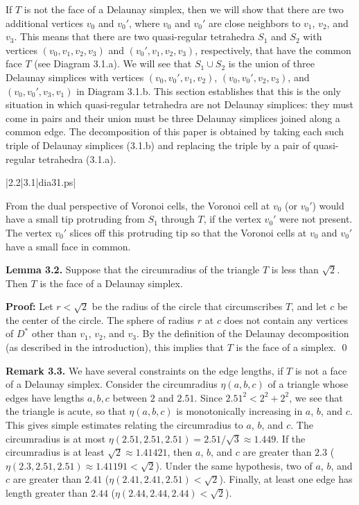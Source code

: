 If $T$ is not the face of a Delaunay simplex, then
we will show that there are two additional vertices
$v_0$ and $v_0'$, where $v_0$ and $v_0'$ are close neighbors
to $v_1$, $v_2$, and $v_3$.  This means that there
are two quasi-regular tetrahedra $S_1$ and $S_2$ with
vertices $(v_0,v_1,v_2,v_3)$ and $(v_0',v_1,v_2,v_3)$, 
respectively,
that have the common face $T$ (see Diagram 3.1.a).
We will see that $S_1\cup S_2$ is the union of three
Delaunay simplices with vertices $(v_0,v_0',v_1,v_2)$, 
$(v_0,v_0',v_2,v_3)$,
and $(v_0,v_0',v_3,v_1)$ 
in Diagram 3.1.b.  This section establishes
that this is the only situation in which quasi-regular
tetrahedra are not Delaunay simplices:  they must come
in pairs and their union must be three Delaunay simplices
joined along a common edge.
The decomposition of this paper is obtained by
taking each such triple of Delaunay simplices (3.1.b)
and replacing the triple by a pair of quasi-regular
tetrahedra (3.1.a).

\gram|2.2|3.1|dia31.ps|  %

From the dual perspective of Voronoi cells, the Voronoi
cell at $v_0$ (or $v_0'$)  would have a small tip protruding from $S_1$
through $T$, if the vertex $v_0'$ were not present.
The vertex $v_0'$ slices off this protruding tip so that
the Voronoi cells at $v_0$ and $v_0'$ have a small face in common.

\bigskip 
{\bf Lemma 3.2.}  Suppose that the circumradius of the triangle $T$
is less than $\sqrt{2}$.  Then $T$ is the face of a Delaunay simplex.

\bigskip
{\bf Proof:}  Let $r<\sqrt{2}$ be the radius of the circle that
circumscribes $T$, and let $c$ be the center of the circle.
The sphere of radius $r$ at $c$ does not contain any vertices of $D^*$
other than $v_1$, $v_2$, and $v_3$.  By the definition of the
Delaunay decomposition (as described in
the introduction), this implies that $T$
is the face of a simplex. \qed

\bigskip
{\bf Remark 3.3.} We have several constraints on the edge lengths, if
$T$ is not a face of a Delaunay simplex.
Consider the circumradius $\eta(a,b,c)$ of 
a triangle whose edges have lengths $a,b,c$
between $2$ and $2.51$.
Since $2.51^2 < 2^2 + 2^2$, we see that the
triangle is acute, so that $\eta(a,b,c)$ 
is monotonically increasing in $a$, $b$, and $c$.
This
gives simple estimates relating the circumradius to $a$, $b$, and $c$.
The circumradius is at most 
$\eta(2.51,2.51,2.51)=2.51/\sqrt{3}\approx 1.449$.
If the circumradius is at least $\sqrt{2}\approx 1.41421$, then
$a$, $b$, and $c$ are greater than $2.3$  
($\eta(2.3,2.51,2.51)\approx 1.41191<\sqrt{2}$).
Under the same hypothesis, two of $a$, $b$, and $c$
are greater than $2.41$  
($\eta(2.41,2.41,2.51)<\sqrt{2}$).  Finally,
at least one edge has length greater than
$2.44$
($\eta(2.44,2.44,2.44)<\sqrt{2}$).

